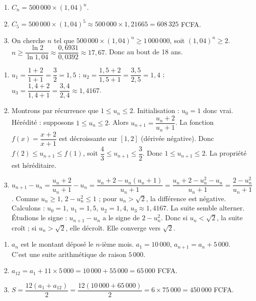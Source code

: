 \begin{enumerate}[label=\alph*)]
\item $C_n = 500\,000 \times (1,04)^n$.
\item $C_5 = 500\,000 \times (1,04)^5 \approx 500\,000 \times 1,21665 = 608\,325$ FCFA.
\item On cherche $n$ tel que $500\,000 \times (1,04)^n \geq 1\,000\,000$, soit $(1,04)^n \geq 2$. $n \geq \dfrac{\ln 2}{\ln 1,04} \approx \dfrac{0,6931}{0,0392} \approx 17,67$. Donc au bout de 18 ans.
\end{enumerate}

\begin{enumerate}[label=\alph*)]
\item $u_1 = \dfrac{1+2}{1+1} = \dfrac{3}{2}=1,5$ ; $u_2 = \dfrac{1,5+2}{1,5+1} = \dfrac{3,5}{2,5}=1,4$ ; $u_3 = \dfrac{1,4+2}{1,4+1} = \dfrac{3,4}{2,4} \approx 1,4167$.
\item Montrons par récurrence que $1 \leq u_n \leq 2$. Initialisation : $u_0=1$ donc vrai. Hérédité : supposons $1 \leq u_n \leq 2$. Alors $u_{n+1} = \dfrac{u_n+2}{u_n+1}$. La fonction $f(x)=\dfrac{x+2}{x+1}$ est décroissante sur $[1,2]$ (dérivée négative). Donc $f(2) \leq u_{n+1} \leq f(1)$, soit $\dfrac{4}{3} \leq u_{n+1} \leq \dfrac{3}{2}$. Donc $1 \leq u_{n+1} \leq 2$. La propriété est héréditaire.
\item $u_{n+1} - u_n = \dfrac{u_n+2}{u_n+1} - u_n = \dfrac{u_n+2 - u_n(u_n+1)}{u_n+1} = \dfrac{u_n+2 - u_n^2 - u_n}{u_n+1} = \dfrac{2 - u_n^2}{u_n+1}$. Comme $u_n \geq 1$, $2 - u_n^2 \leq 1$ ; pour $u_n > \sqrt{2}$, la différence est négative. Calculons : $u_0=1$, $u_1=1,5$, $u_2=1,4$, $u_3\approx1,4167$. La suite semble alterner. Étudions le signe : $u_{n+1} - u_n$ a le signe de $2 - u_n^2$. Donc si $u_n < \sqrt{2}$, la suite croît ; si $u_n > \sqrt{2}$, elle décroît. Elle converge vers $\sqrt{2}$.
\end{enumerate}

\begin{enumerate}[label=\alph*)]
\item $a_n$ est le montant déposé le $n$-ième mois. $a_1 = 10\,000$, $a_{n+1} = a_n + 5\,000$. C'est une suite arithmétique de raison $5\,000$.
\item $a_{12} = a_1 + 11\times5\,000 = 10\,000 + 55\,000 = 65\,000$ FCFA.
\item $S = \dfrac{12(a_1 + a_{12})}{2} = \dfrac{12(10\,000 + 65\,000)}{2} = 6 \times 75\,000 = 450\,000$ FCFA.
\end{enumerate}

